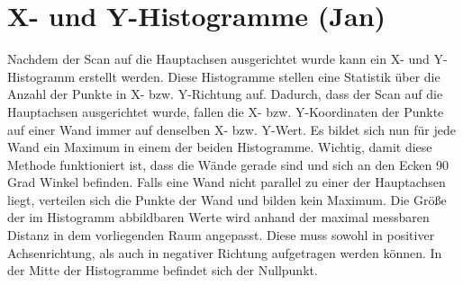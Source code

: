 \section{X- und Y-Histogramme (Jan)}

Nachdem der Scan auf die Hauptachsen ausgerichtet wurde kann ein X- und Y-Histogramm erstellt werden. Diese Histogramme stellen eine Statistik über die Anzahl der Punkte in X- bzw. Y-Richtung auf.
Dadurch, dass der Scan auf die Hauptachsen ausgerichtet wurde, fallen die X- bzw. Y-Koordinaten der Punkte auf einer Wand immer auf denselben X- bzw. Y-Wert. Es bildet sich nun für jede Wand ein Maximum in einem der beiden Histogramme. Wichtig, damit diese Methode funktioniert ist, dass die Wände gerade sind und sich an den Ecken 90 Grad Winkel befinden. Falls eine Wand nicht parallel zu einer der Hauptachsen liegt, verteilen sich die Punkte der Wand und bilden kein Maximum. Die Größe der im Histogramm abbildbaren Werte wird anhand der maximal messbaren Distanz in dem vorliegenden Raum angepasst. Diese muss sowohl in positiver Achsenrichtung, als auch in negativer Richtung aufgetragen werden können. In der Mitte der Histogramme befindet sich der Nullpunkt.

